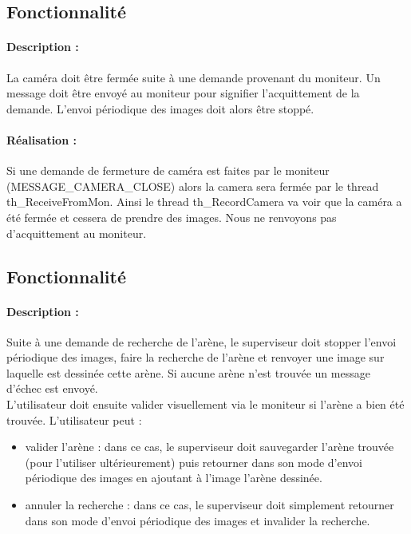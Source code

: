 \documentclass[11pt, a4paper]{paper}
\newcounter{cptreq}
\begin{document}
{{\subsection{Fonctionnalité \thecptreq}

\paragraph{Description :} La caméra doit être fermée suite à une demande provenant du moniteur. Un message doit être envoyé au moniteur pour signifier l'acquittement de la demande. L'envoi périodique des images doit alors être stoppé.

\paragraph{\color{black}Réalisation :}  {\color{black} Si une demande de fermeture de caméra est faites par le moniteur (MESSAGE\_CAMERA\_CLOSE) alors la camera sera fermée par le thread th\_ReceiveFromMon. Ainsi le thread th\_RecordCamera va voir que la caméra a été fermée et cessera de prendre des images. Nous ne renvoyons pas d'acquittement au moniteur.  }
\subsection{Fonctionnalité \thecptreq}

\paragraph{Description :} Suite à une demande de recherche de l'arène, le superviseur doit stopper l'envoi périodique des images, faire la recherche de l'arène et renvoyer une image sur laquelle est dessinée cette arène. Si aucune arène n'est trouvée un message d'échec est envoyé.\\

L'utilisateur doit ensuite valider visuellement via le moniteur si l'arène a bien été trouvée. L'utilisateur peut :
\begin{itemize}
	\item valider l'arène : dans ce cas, le superviseur doit sauvegarder l'arène trouvée (pour l'utiliser ultérieurement) puis retourner dans son mode d'envoi périodique des images en ajoutant à l'image l'arène dessinée.
 	\item annuler la recherche : dans ce cas, le superviseur doit simplement retourner dans son mode d'envoi périodique des images et invalider la recherche.
\end{itemize}

}}
\end{document}
